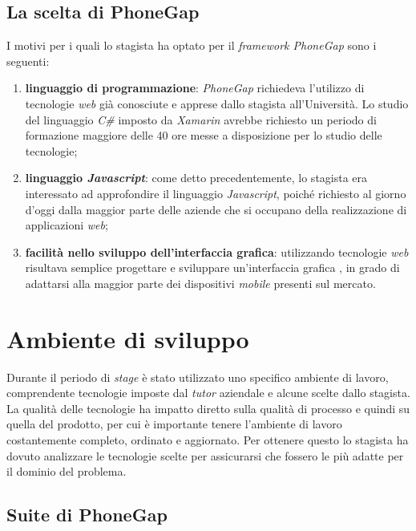 \subsection{La scelta di PhoneGap}

I motivi per i quali lo stagista ha optato per il \textit{framework PhoneGap} sono i seguenti:
\begin{enumerate}
	\item \textbf{linguaggio di programmazione}: \textit{PhoneGap} richiedeva l'utilizzo di tecnologie \textit{web} già conosciute e apprese dallo stagista all'Università. Lo studio del linguaggio \textit{C\#} imposto da \textit{Xamarin} avrebbe richiesto un periodo di formazione maggiore delle 40 ore messe a disposizione per lo studio delle tecnologie;
	\item \textbf{linguaggio \textit{Javascript}}: come detto precedentemente, lo stagista era interessato ad approfondire il linguaggio \textit{Javascript}, poiché richiesto al giorno d'oggi dalla maggior parte delle aziende che si occupano della realizzazione di applicazioni \textit{web};
	\item \textbf{facilità nello sviluppo dell'interfaccia grafica}: utilizzando tecnologie \textit{web} risultava semplice progettare e sviluppare un'interfaccia grafica , in grado di adattarsi alla maggior parte dei dispositivi \textit{mobile} presenti sul mercato.
\end{enumerate}

\section{Ambiente di sviluppo}

Durante il periodo di \textit{stage} è stato utilizzato uno specifico ambiente di lavoro, comprendente tecnologie imposte dal \textit{tutor} aziendale e alcune scelte dallo stagista. La qualità delle tecnologie ha impatto diretto sulla qualità di processo e quindi su quella del prodotto, per cui è importante tenere l'ambiente di lavoro costantemente completo, ordinato e aggiornato. Per ottenere questo lo stagista ha dovuto analizzare le tecnologie scelte per assicurarsi che fossero le più adatte per il dominio del problema.

\subsection{Suite di PhoneGap}

